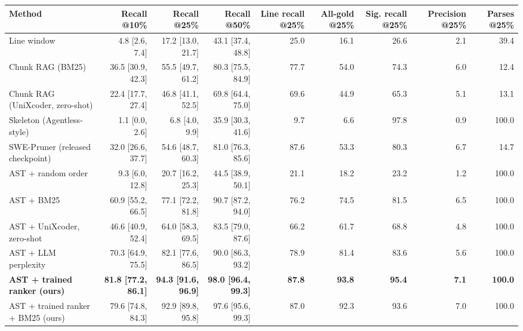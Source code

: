 \begin{tabular}{lrrrrrrrr}
\toprule
Method & Recall @10\% & Recall @25\% & Recall @50\% & Line recall @25\% & All-gold @25\% & Sig. recall @25\% & Precision @25\% & Parses @25\% \\
\midrule
Line window & 4.8 [2.6, 7.4] & 17.2 [13.0, 21.7] & 43.1 [37.4, 48.8] & 25.0 & 16.1 & 26.6 & 2.1 & 39.4 \\
Chunk RAG (BM25) & 36.5 [30.9, 42.3] & 55.5 [49.7, 61.2] & 80.3 [75.5, 84.9] & 77.7 & 54.0 & 74.3 & 6.0 & 12.4 \\
Chunk RAG (UniXcoder, zero-shot) & 22.4 [17.7, 27.4] & 46.8 [41.1, 52.5] & 69.8 [64.4, 75.0] & 69.6 & 44.9 & 65.3 & 5.1 & 13.1 \\
Skeleton (Agentless-style) & 1.1 [0.0, 2.6] & 6.8 [4.0, 9.9] & 35.9 [30.3, 41.6] & 9.7 & 6.6 & 97.8 & 0.9 & 100.0 \\
SWE-Pruner (released checkpoint) & 32.0 [26.6, 37.7] & 54.6 [48.7, 60.3] & 81.0 [76.3, 85.6] & 87.6 & 53.3 & 80.3 & 6.7 & 14.7 \\
AST + random order & 9.3 [6.0, 12.8] & 20.7 [16.2, 25.3] & 44.5 [38.9, 50.1] & 21.1 & 18.2 & 23.2 & 1.2 & 100.0 \\
AST + BM25 & 60.9 [55.2, 66.5] & 77.1 [72.2, 81.8] & 90.7 [87.2, 94.0] & 76.2 & 74.5 & 81.5 & 6.5 & 100.0 \\
AST + UniXcoder, zero-shot & 46.6 [40.9, 52.4] & 64.0 [58.3, 69.5] & 83.5 [79.0, 87.6] & 66.2 & 61.7 & 68.8 & 4.8 & 100.0 \\
AST + LLM perplexity & 70.3 [64.9, 75.5] & 82.1 [77.6, 86.5] & 90.0 [86.3, 93.2] & 78.9 & 81.4 & 83.6 & 5.6 & 100.0 \\
\textbf{AST + trained ranker (ours)} & \textbf{81.8 [77.2, 86.1]} & \textbf{94.3 [91.6, 96.9]} & \textbf{98.0 [96.4, 99.3]} & \textbf{87.8} & \textbf{93.8} & \textbf{95.4} & \textbf{7.1} & \textbf{100.0} \\
AST + trained ranker + BM25 (ours) & 79.6 [74.8, 84.3] & 92.9 [89.8, 95.8] & 97.6 [95.6, 99.3] & 87.0 & 92.3 & 93.6 & 7.0 & 100.0 \\
\bottomrule
\end{tabular}

